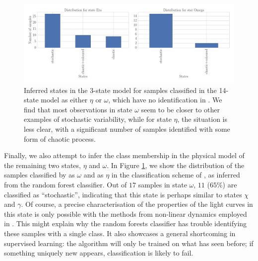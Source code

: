 \documentclass[fleqn,usenatbib]{mnras}
\begin{document}
\begin{figure}
\begin{center}
\includegraphics[width=\textwidth]{grs1915_supervised_eta_omega.pdf}
\caption{Inferred states in the 3-state model for samples classified in the 14-state model as either $\eta$ or $\omega$, which have no identification in \citet{harikrishnan2011}.
We find that most observations in state $\omega$ seem to be closer to other examples of stochastic variability, while for state $\eta$, the situation is less clear, with a significant 
number of samples identified with some form of chaotic process.} 
\label{fig:etaomega_states}
\end{center}
\end{figure}

Finally, we also  attempt to infer the class membership in the physical model of the remaining two states, $\eta$ and $\omega$. 
In Figure \ref{fig:etaomega_states}, we show the distribution of the samples classified by \citet{kleinwolt2002} as $\omega$ and \citet{hannikainen2003} as $\eta$ 
in the classification scheme of \citet{harikrishnan2011}, as inferred from the random forest classifier.
Out of $17$ samples in state $\omega$, $11$  ($65\%$) are classified as ``stochastic'', indicating that this state is perhaps similar to states $\chi$ and $\gamma$. Of course, a precise characterisation of the properties of the light curves in this state is only possible with the methods from non-linear dynamics employed in \citet{harikrishnan2011}. This might explain why the random forests classifier has trouble identifying these samples with a single class. It also showcases a general shortcoming in supervised learning: the algorithm will only 
be trained on what has seen before; if something uniquely new appears, classification is likely to fail.
\end{document}
